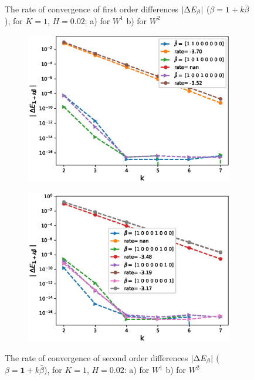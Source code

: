 \documentclass[11pt]{article}
\begin{document}
\begin{figure}[h!]
	
	
	\caption{The rate of convergence of  first order differences $\left\lvert\Delta E_{\beta}\right\rvert$ ($\beta=\mathbf{1}+k \bar{\beta}$), for $K=1$, $H=0.02$: a) for $W^1$ b) for $W^2$}
	\label{fig:first_diff_comp_K_1_H_002_wihtout_change_measure}
\end{figure}


\begin{figure}[h!]
	\centering
	\begin{subfigure}{.4\textwidth}
		\centering
		\includegraphics[width=1\linewidth]{./figures/rBergomi_mixed_error_rates/without_change_measure/N_4/H_002/mixed_difference_order2_rbergomi_4steps_H_002_K_1_totally_hierarch_with_rate_W1}
		\caption{}
		\label{fig:sub3}
	\end{subfigure}%
	\begin{subfigure}{.4\textwidth}
		\centering
		\includegraphics[width=1\linewidth]{./figures/rBergomi_mixed_error_rates/without_change_measure/N_4/H_002/mixed_difference_order2_rbergomi_4steps_H_002_K_1_totally_hierarch_with_rate_W2}
		\caption{}
		\label{fig:sub4}
	\end{subfigure}
	
	\caption{The rate of convergence of  second order differences $\left\lvert\Delta E_{\beta}\right\rvert$ ($\beta=\mathbf{1}+k \bar{\beta}$), for $K=1$, $H=0.02$: a) for $W^1$ b) for $W^2$}
	\label{fig:second_diff_comp_K_1_H_002_wihtout_change_measure}
\end{figure}
\end{document}
